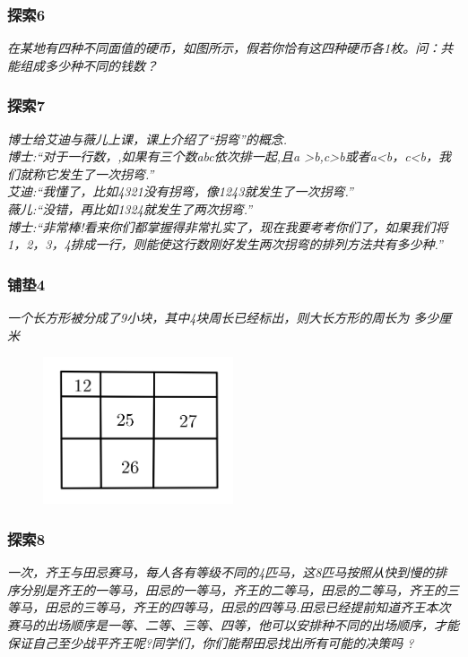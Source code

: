 \begin{frame}
    \frametitle{探索6}
    \textit{在某地有四种不同面值的硬币，如图所示，假若你恰有这四种硬币各1枚。问：共能组成多少种不同的钱数？}
\end{frame}

\begin{frame}
    \frametitle{探索7}
    \textit{博士给艾迪与薇儿上课，课上介绍了“拐弯”的概念. } \\
    \textit{博士:``对于一行数，,如果有三个数abc依次排一起,且a >b,c>b或者a<b，c<b，我们就称它发生了一次拐弯.'' \\
    艾迪:``我懂了，比如4321没有拐弯，像1243就发生了一次拐弯.'' \\
    薇儿:``没错，再比如1324就发生了两次拐弯.'' \\
    博士:``非常棒!看来你们都掌握得非常扎实了，现在我要考考你们了，如果我们将1，2，3，4排成一行，则能使这行数刚好发生两次拐弯的排列方法共有多少种.''}
\end{frame}

\begin{frame}
    \frametitle{铺垫4}
    \textit{一个长方形被分成了9小块，其中4块周长已经标出，则大长方形的周长为
    多少厘米}
    \begin{figure}[H] 
        \centering
        \includegraphics[width=0.5\textwidth]{./pics/Chapter_1/pudian4.png}
    \end{figure}
\end{frame}

\begin{frame}
    \frametitle{探索8}
    \textit{一次，齐王与田忌赛马，每人各有等级不同的4匹马，这8匹马按照从快到慢的排序分别是齐王的一等马，田忌的一等马，齐王的二等马，田忌的二等马，齐王的三等马，田忌的三等马，齐王的四等马，田忌的四等马.田忌已经提前知道齐王本次赛马的出场顺序是一等、二等、三等、四等，他可以安排种不同的出场顺序，才能保证自己至少战平齐王呢?同学们，你们能帮田忌找出所有可能的决策吗 ?}
\end{frame}
